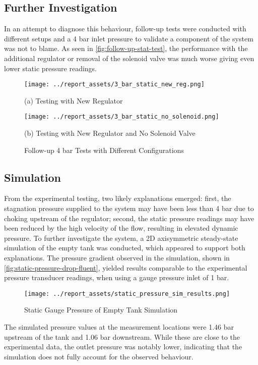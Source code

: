 \subsection{Further Investigation}
In an attempt to diagnose this behaviour, follow-up tests were conducted with different setups and a 4 bar inlet pressure to validate a component of the system was not to blame. As seen in \autoref{fig:follow-up-stat-test}, the performance with the additional regulator or removal of the solenoid valve was much worse giving even lower static pressure readings. 
\begin{figure}[htbp]
    \centering

    \begin{minipage}{0.45\textwidth}
        \centering
        \texttt{[image: ../report\_assets/3\_bar\_static\_new\_reg.png]}
        \caption*{(a) Testing with New Regulator}\label{fig:static-pressure-drop-new-reg}
    \end{minipage}    
    \hfill
    \begin{minipage}{0.45\textwidth}
        \centering
        \texttt{[image: ../report\_assets/3\_bar\_static\_no\_solenoid.png]}
        \caption*{(b) Testing with New Regulator and No Solenoid Valve}\label{fig:static-pressure-drop-no-solenoid}
    \end{minipage}    
    \caption{Follow-up 4 bar Tests with Different Configurations}\label{fig:follow-up-stat-test}
\end{figure}    


\subsection{Simulation}
From the experimental testing, two likely explanations emerged: first, the stagnation pressure supplied to the system may have been less than 4 bar due to choking upstream of the regulator; second, the static pressure readings may have been reduced by the high velocity of the flow, resulting in elevated dynamic pressure. To further investigate the system, a 2D axisymmetric steady-state simulation of the empty tank was conducted, which appeared to support both explanations. The pressure gradient observed in the simulation, shown in \autoref{fig:static-pressure-drop-fluent}, yielded results comparable to the experimental pressure transducer readings, when using a gauge pressure inlet of 1 bar.
\begin{figure}[htbp]
    \centering
    
    \begin{minipage}{0.9\textwidth}
        \centering
        \texttt{[image: ../report\_assets/static\_pressure\_sim\_results.png]}
        \caption{Static Gauge Pressure of Empty Tank Simulation}\label{fig:static-pressure-drop-fluent}
    \end{minipage}    
    
\end{figure}    
The simulated pressure values at the measurement locations were 1.46 bar upstream of the tank and 1.06 bar downstream. While these are close to the experimental data, the outlet pressure was notably lower, indicating that the simulation does not fully account for the observed behaviour.

